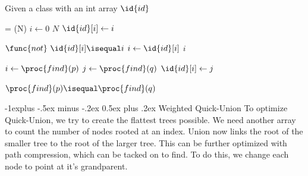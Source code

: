 \documentclass[letterpaper, 8pt]{extarticle}
\makeatletter
\renewcommand{\subsection}{\@startsection{subsection}{2}{0mm}%
                                {-1explus -.5ex minus -.2ex}%
                                {0.5ex plus .2ex}%
                                {\normalfont\small\bfseries}}
\makeatother
\begin{document}
\begin{multicols*}{5}
  Given a class with an int array $\id{id}$
  \begin{codebox}
    \li {} = (N)
    \li \For $i \gets 0$ \To $N$
    \li   \Do
            $\id{id}[i] \gets i$
          \End
  \end{codebox}
  \begin{codebox}
    \li \While $\func{not}\ \id{id}[i] \isequal i$
    \li   \Do
            $i \gets \id{id}[i]$
          \End
    \li \Return $i$
  \end{codebox}
  \begin{codebox}
    \li $i \gets \proc{find}(p)$
    \li $j \gets \proc{find}(q)$
    \li $\id{id}[i] \gets j$
  \end{codebox}
  \begin{codebox}
    \li \Return $\proc{find}(p) \isequal \proc{find}(q)$
  \end{codebox}

  \subsection{Weighted Quick-Union}
  To optimize Quick-Union, we try to create the flattest trees possible. We need another array to count the number of nodes rooted at an index. Union now links the root of the smaller tree to the root of the larger tree. This can be further optimized with path compression, which can be tacked on to find. To do this, we change each node to point at it's grandparent.



\end{multicols*}
\end{document}

